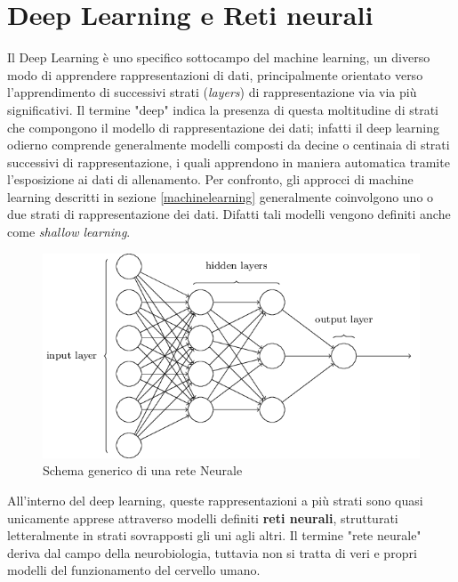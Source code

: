 \newpage
\section{Deep Learning e Reti neurali}
Il Deep Learning è uno specifico sottocampo del machine learning, un diverso modo di apprendere rappresentazioni di dati, principalmente orientato verso l'apprendimento di successivi strati (\textit{layers}) di rappresentazione via via più significativi. Il termine "deep" indica la presenza di questa moltitudine di strati che compongono il modello
di rappresentazione dei dati; infatti il deep learning odierno comprende generalmente modelli composti da decine o centinaia di strati successivi di rappresentazione, i quali apprendono in maniera automatica tramite l'esposizione ai dati di allenamento. Per confronto, gli approcci di machine learning descritti in sezione \ref{machinelearning} generalmente coinvolgono uno o due strati di rappresentazione dei dati. Difatti tali modelli vengono definiti anche come \textit{shallow learning}.
 
\begin{figure}[htbp]
	\centering
	\includegraphics[width=\columnwidth]{figures/mlp-network.png}
	\caption{Schema generico di una rete Neurale \label{nn}}
\end{figure} 
 
All'interno del deep learning, queste rappresentazioni a più strati sono quasi unicamente apprese attraverso modelli definiti \textbf{reti neurali}, strutturati letteralmente in strati sovrapposti gli uni agli altri. Il termine "rete neurale" deriva dal campo della neurobiologia, tuttavia non si tratta di veri e propri modelli del funzionamento del cervello umano.

